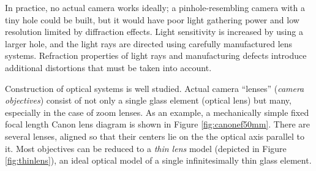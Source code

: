 
In practice, no actual camera works ideally; a pinhole-resembling camera with a tiny hole could be built, but it would have poor light gathering power and low resolution limited by diffraction effects. \cite{greenleaf1950photographic}
Light sensitivity is increased by using a larger hole, and the light rays are directed using carefully manufactured lens systems.
Refraction properties of light rays and manufacturing defects introduce additional distortions that must be taken into account.

Construction of optical systems is well studied. \cite{kingslake1989history,greenleaf1950photographic}
Actual camera ``lenses'' (\emph{camera objectives}) consist of not only a single glass element (optical lens) but many, especially in the case of zoom lenses.
As an example, a mechanically simple fixed focal length Canon lens diagram is shown in Figure \ref{fig:canonef50mm}.
There are several lenses, aligned so that their centers lie on the the optical axis parallel to it.
Most objectives can be reduced to a \emph{thin lens} model (depicted in Figure \ref{fig:thinlens}), an ideal optical model of a single infinitesimally thin glass element.
 \cite{greenleaf1950photographic,szeliski10vision}




